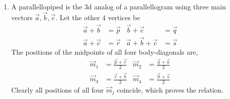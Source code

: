 \begin{enumerate}
\begin{enumerate}
              \item A parallellopiped is the 3d analog of a parallellogram using
                    three main vectors $ \vec{a}, \vec{b}, \vec{c} $. Let the other 4
                    vertices be
                    \begin{align}
                        \vec{a} + \vec{b}           & = \vec{p} &
                        \vec{b} + \vec{c}           & = \vec{q}   \\
                        \vec{a} + \vec{c}           & = \vec{r} &
                        \vec{a} + \vec{b} + \vec{c} & = \vec{s}
                    \end{align}
                    The positions of the midpoints of all four body-diagonals are,
                    \begin{align}
                        \vec{m}_1 & = \frac{\vec{p} + \vec{c}}{2} &
                        \vec{m}_2 & = \frac{\vec{q} + \vec{a}}{2}   \\
                        \vec{m}_3 & = \frac{\vec{r} + \vec{b}}{2} &
                        \vec{m}_4 & = \frac{\vec{0} + \vec{s}}{2}
                    \end{align}
                    Clearly all positions of all four $ \vec{m}_j $ coincide, which
                    proves the relation.


\end{enumerate}
\end{enumerate}
